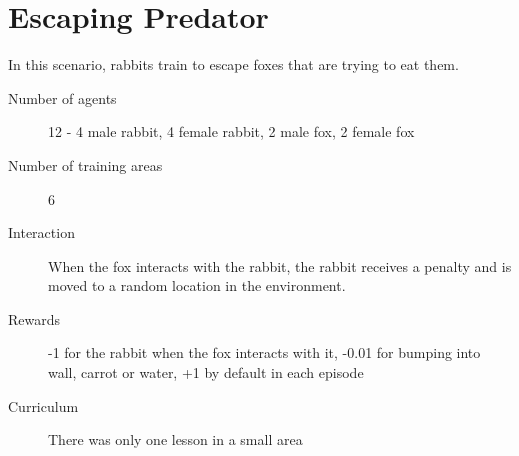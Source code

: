 \section{Escaping Predator}
In this scenario, rabbits train to escape foxes that are trying to eat them.
\begin{description}
    \item[Number of agents] 12 - 4 male rabbit, 4 female rabbit, 2 male fox, 2 female fox
    \item[Number of training areas] 6
    \item[Interaction] When the fox interacts with the rabbit, the rabbit receives a penalty and is moved to a random location in the environment.
    \item[Rewards] -1 for the rabbit when the fox interacts with it, -0.01 for bumping into wall, carrot or water, +1 by default in each episode
    \item[Curriculum] There was only one lesson in a small area
\end{description}